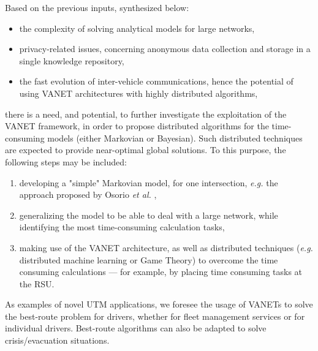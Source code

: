 \documentclass[10pt,onecolumn]{article}
\begin{document}
Based on the previous inputs, synthesized below:
\begin{itemize}
\item the complexity of solving analytical models for large networks,
\item privacy-related issues, concerning anonymous data collection and storage in a single knowledge repository,
\item the fast evolution of inter-vehicle communications, hence the potential of using VANET architectures with highly distributed algorithms, 
\end{itemize}
there is a need, and potential, to further investigate the exploitation of the VANET framework, in order to propose distributed algorithms for the time-consuming models (either Markovian or Bayesian).
Such distributed techniques are expected to provide near-optimal global solutions. To this purpose, the following steps may be included:
\begin{enumerate}
\item developing a "simple" Markovian model, for one intersection, \textit{e.g.} the approach proposed by Osorio \textit{et al.} \cite{Osorio2009},
\item generalizing the model to be able to deal with a large network, while identifying the most time-consuming calculation tasks,
\item making use of the VANET architecture, as well as distributed techniques (\textit{e.g.} distributed machine learning or Game Theory) to overcome the time consuming calculations --- for example, by placing time consuming tasks at the RSU.
\end{enumerate}
As examples of novel UTM applications, we foresee the usage of VANETs to solve the best-route problem for drivers, whether for fleet management services or for individual drivers. Best-route algorithms can also be adapted to solve crisis/evacuation situations.
\end{document}
